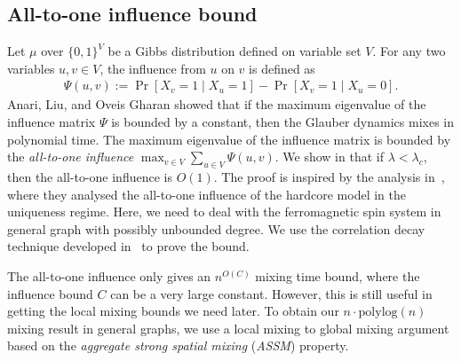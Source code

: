 \documentclass[11pt]{amsart}
\renewcommand{\Pr}{\mathop{\mathrm{Pr}}\nolimits}
\newcommand{\defeq}{:=}
\theoremstyle{definition}
\theoremstyle{remark}
\begin{document}
\subsection{All-to-one influence bound}
Let $\mu$ over $\{0,1\}^V$ be a Gibbs distribution defined on variable set $V$. For any two variables $u,v \in V$, the influence from $u$ on $v$ is defined as
\begin{align*}
    \Psi(u,v) \defeq \Pr[X_v = 1 \mid X_u = 1] - \Pr[X_v = 1 \mid X_u = 0].
\end{align*}
Anari, Liu, and Oveis Gharan \cite{ALO24} showed that if the maximum eigenvalue of the influence matrix $\Psi$ is bounded by a constant, then the Glauber dynamics mixes in polynomial time. The maximum eigenvalue of the influence matrix is bounded by the \emph{all-to-one influence} $\max_{v \in V} \sum_{u \in V} \Psi(u,v)$.
We show in  that if $\lambda < \lambda_c$, then the all-to-one influence is $O(1)$. The proof is inspired by the analysis in~\cite{ALO24}, where they analysed the all-to-one influence of the hardcore model in the uniqueness regime. Here, we need to deal with the ferromagnetic spin system in general graph with possibly unbounded degree. We use the correlation decay technique developed in~\cite{GuoL18} to prove the bound.

The all-to-one influence only gives an $n^{O(C)}$ mixing time bound, where the influence bound $C$ can be a very large constant. 
However, this is still useful in getting the local mixing bounds we need later.
To obtain our $n \cdot \mathrm{polylog}(n)$ mixing result in general graphs, we use a local mixing to global mixing argument based on the \emph{aggregate strong spatial mixing} (\emph{ASSM}) property.
\end{document}
